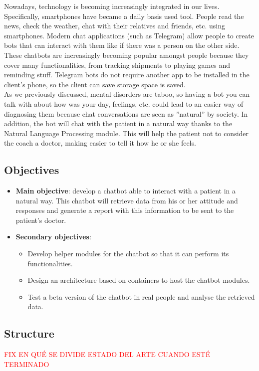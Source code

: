 \documentclass[12pt,english]{article}
\begin{document}
Nowadays, technology is becoming increasingly integrated in our lives. Specifically, smartphones have became a daily basis used tool. People read the news, check the weather, chat with their relatives and friends, etc. using smartphones. Modern chat applications (such as Telegram) allow people to create bots that can interact with them like if there was a person on the other side. These chatbots are increasingly becoming popular amongst people because they cover many functionalities, from tracking shipments to playing games and reminding stuff. Telegram bots do not require another app to be installed in the client's phone, so the client can save storage space is saved.\\

As we previously discussed, mental disorders are taboo, so having a bot you can talk with about how was your day, feelings, etc. could lead to an easier way of diagnosing them because chat conversations are seen as ''natural'' by society. In addition, the bot will chat with the patient in a natural way thanks to the Natural Language Processing module. This will help the patient not to consider the coach a doctor, making easier to tell it how he or she feels.

\newpage

\subsection{Objectives}

\begin{itemize}
  \item \textbf{Main objective}: develop a chatbot able to interact with a patient in a natural way. This chatbot will retrieve data from his or her attitude and responses and generate a report with this information to be sent to the patient's doctor.
  \item \textbf{Secondary objectives}:
    \begin{itemize}
      \item Develop helper modules for the chatbot so that it can perform its functionalities.
      \item Design an architecture based on containers to host the chatbot modules.
      \item Test a beta version of the chatbot in real people and analyse the retrieved data.
    \end{itemize}
\end{itemize}

\subsection{Structure}
\textcolor{red}{FIX EN QUÉ SE DIVIDE ESTADO DEL ARTE CUANDO ESTÉ TERMINADO}
\end{document}
